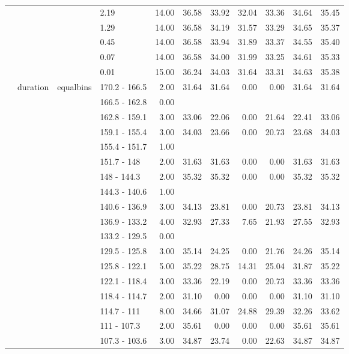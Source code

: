 \begin{longtable}{llllrrrrrrr}
   &  &  & 2.19 & 14.00 & 36.58 & 33.92 & 32.04 & 33.36 & 34.64 & 35.45 \\ 
   &  &  & 1.29 & 14.00 & 36.58 & 34.19 & 31.57 & 33.29 & 34.65 & 35.37 \\ 
   &  &  & 0.45 & 14.00 & 36.58 & 33.94 & 31.89 & 33.37 & 34.55 & 35.40 \\ 
   &  &  & 0.07 & 14.00 & 36.58 & 34.00 & 31.99 & 33.25 & 34.61 & 35.33 \\ 
   &  &  & 0.01 & 15.00 & 36.24 & 34.03 & 31.64 & 33.31 & 34.63 & 35.38 \\ 
   & duration & equalbins & 170.2 - 166.5 & 2.00 & 31.64 & 31.64 & 0.00 & 0.00 & 31.64 & 31.64 \\ 
   &  &  & 166.5 - 162.8 & 0.00 &  &  &  &  &  &  \\ 
   &  &  & 162.8 - 159.1 & 3.00 & 33.06 & 22.06 & 0.00 & 21.64 & 22.41 & 33.06 \\ 
   &  &  & 159.1 - 155.4 & 3.00 & 34.03 & 23.66 & 0.00 & 20.73 & 23.68 & 34.03 \\ 
   &  &  & 155.4 - 151.7 & 1.00 &  &  &  &  &  &  \\ 
   &  &  & 151.7 - 148 & 2.00 & 31.63 & 31.63 & 0.00 & 0.00 & 31.63 & 31.63 \\ 
   &  &  & 148 - 144.3 & 2.00 & 35.32 & 35.32 & 0.00 & 0.00 & 35.32 & 35.32 \\ 
   &  &  & 144.3 - 140.6 & 1.00 &  &  &  &  &  &  \\ 
   &  &  & 140.6 - 136.9 & 3.00 & 34.13 & 23.81 & 0.00 & 20.73 & 23.81 & 34.13 \\ 
   &  &  & 136.9 - 133.2 & 4.00 & 32.93 & 27.33 & 7.65 & 21.93 & 27.55 & 32.93 \\ 
   &  &  & 133.2 - 129.5 & 0.00 &  &  &  &  &  &  \\ 
   &  &  & 129.5 - 125.8 & 3.00 & 35.14 & 24.25 & 0.00 & 21.76 & 24.26 & 35.14 \\ 
   &  &  & 125.8 - 122.1 & 5.00 & 35.22 & 28.75 & 14.31 & 25.04 & 31.87 & 35.22 \\ 
   &  &  & 122.1 - 118.4 & 3.00 & 33.36 & 22.19 & 0.00 & 20.73 & 33.36 & 33.36 \\ 
   &  &  & 118.4 - 114.7 & 2.00 & 31.10 & 0.00 & 0.00 & 0.00 & 31.10 & 31.10 \\ 
   &  &  & 114.7 - 111 & 8.00 & 34.66 & 31.07 & 24.88 & 29.39 & 32.26 & 33.62 \\ 
   &  &  & 111 - 107.3 & 2.00 & 35.61 & 0.00 & 0.00 & 0.00 & 35.61 & 35.61 \\ 
   &  &  & 107.3 - 103.6 & 3.00 & 34.87 & 23.74 & 0.00 & 22.63 & 34.87 & 34.87 \\ 

\end{longtable}
